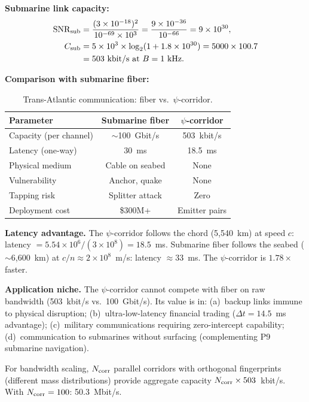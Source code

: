 \documentclass[aps,prd,twocolumn,superscriptaddress,nofootinbib]{revtex4-2}
\newcommand{\SNR}{\mathrm{SNR}}
\begin{document}
\textbf{Submarine link capacity:}
\begin{align}
\SNR_{\rm sub} &= \frac{(3\times10^{-18})^2}{10^{-69}\times 10^3}
= \frac{9\times10^{-36}}{10^{-66}} = 9\times10^{30}, \\
C_{\rm sub} &= 5\times10^3\times\log_2(1+1.8\times10^{30})
= 5000\times 100.7 \nonumber\\
&= 503~\text{kbit/s at } B = 1~\text{kHz}.
\label{eq:sub-capacity}
\end{align}

\textbf{Comparison with submarine fiber:}

\begin{table}[h]
\caption{Trans-Atlantic communication: fiber vs.\ $\psi$-corridor.}
\begin{ruledtabular}
\begin{tabular}{lcc}
Parameter & Submarine fiber & $\psi$-corridor \\
\hline
Capacity (per channel) & $\sim$100~Gbit/s & 503~kbit/s \\
Latency (one-way) & 30~ms & 18.5~ms \\
Physical medium & Cable on seabed & None \\
Vulnerability & Anchor, quake & None \\
Tapping risk & Splitter attack & Zero \\
Deployment cost & \$300M+ & Emitter pairs \\
\end{tabular}
\end{ruledtabular}
\end{table}

\textbf{Latency advantage.}  The $\psi$-corridor follows the chord
(5,540~km) at speed $c$: latency $= 5.54\times10^6/(3\times10^8)
= 18.5$~ms.  Submarine fiber follows the seabed ($\sim$6,600~km)
at $c/n \approx 2\times10^8$~m/s: latency $\approx 33$~ms.
The $\psi$-corridor is $1.78\times$ faster.

\textbf{Application niche.}  The $\psi$-corridor cannot compete with
fiber on raw bandwidth (503~kbit/s vs.\ 100~Gbit/s).  Its value is
in: (a)~backup links immune to physical disruption; (b)~ultra-low-latency
financial trading ($\Delta t = 14.5$~ms advantage); (c)~military
communications requiring zero-intercept capability; (d)~communication
to submarines without surfacing (complementing P9 submarine navigation).

For bandwidth scaling, $N_{\rm corr}$ parallel corridors with
orthogonal fingerprints (different mass distributions) provide
aggregate capacity $N_{\rm corr}\times 503$~kbit/s.  With
$N_{\rm corr} = 100$: 50.3~Mbit/s.
\end{document}

